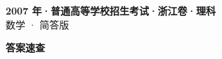 \documentclass[zihao=-4, a4paper]{ctexart}
\begin{document}
\begin{center}
  {\Large\bfseries 2007 年·普通高等学校招生考试·浙江卷·理科}\\[4pt]
  {\large 数学 · 简答版}
\end{center}
\medskip
{}

\clearpage
{}
\begin{center}{\Large\bfseries 答案速查}\end{center}
\medskip

\end{document}
